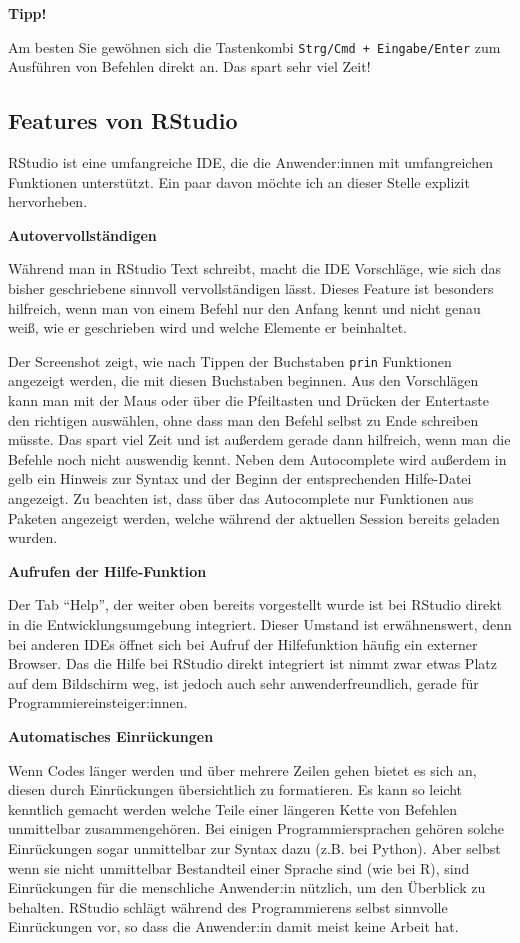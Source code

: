 \documentclass[
]{book}
\begin{document}
\textbf{Tipp!}

Am besten Sie gewöhnen sich die Tastenkombi \texttt{Strg/Cmd\ +\ Eingabe/Enter} zum Ausführen von Befehlen direkt an. Das spart sehr viel Zeit!

\hypertarget{features-von-rstudio}{%
\subsection{Features von RStudio}\label{features-von-rstudio}}

RStudio ist eine umfangreiche IDE, die die Anwender:innen mit umfangreichen Funktionen unterstützt. Ein paar davon möchte ich an dieser Stelle explizit hervorheben.

\textbf{Autovervollständigen}

Während man in RStudio Text schreibt, macht die IDE Vorschläge, wie sich das bisher geschriebene sinnvoll vervollständigen lässt. Dieses Feature ist besonders hilfreich, wenn man von einem Befehl nur den Anfang kennt und nicht genau weiß, wie er geschrieben wird und welche Elemente er beinhaltet.

Der Screenshot zeigt, wie nach Tippen der Buchstaben \texttt{prin} Funktionen angezeigt werden, die mit diesen Buchstaben beginnen. Aus den Vorschlägen kann man mit der Maus oder über die Pfeiltasten und Drücken der Entertaste den richtigen auswählen, ohne dass man den Befehl selbst zu Ende schreiben müsste. Das spart viel Zeit und ist außerdem gerade dann hilfreich, wenn man die Befehle noch nicht auswendig kennt. Neben dem Autocomplete wird außerdem in gelb ein Hinweis zur Syntax und der Beginn der entsprechenden Hilfe-Datei angezeigt. Zu beachten ist, dass über das Autocomplete nur Funktionen aus Paketen angezeigt werden, welche während der aktuellen Session bereits geladen wurden.

\textbf{Aufrufen der Hilfe-Funktion}

Der Tab ``Help'', der weiter oben bereits vorgestellt wurde ist bei RStudio direkt in die Entwicklungsumgebung integriert.
Dieser Umstand ist erwähnenswert, denn bei anderen IDEs öffnet sich bei Aufruf der Hilfefunktion häufig ein externer Browser.
Das die Hilfe bei RStudio direkt integriert ist nimmt zwar etwas Platz auf dem Bildschirm weg, ist jedoch auch sehr anwenderfreundlich, gerade für Programmiereinsteiger:innen.

\textbf{Automatisches Einrückungen}

Wenn Codes länger werden und über mehrere Zeilen gehen bietet es sich an, diesen durch Einrückungen übersichtlich zu formatieren. Es kann so leicht kenntlich gemacht werden welche Teile einer längeren Kette von Befehlen unmittelbar zusammengehören.
Bei einigen Programmiersprachen gehören solche Einrückungen sogar unmittelbar zur Syntax dazu (z.B. bei Python). Aber selbst wenn sie nicht unmittelbar Bestandteil einer Sprache sind (wie bei R), sind Einrückungen für die menschliche Anwender:in nützlich, um den Überblick zu behalten.
RStudio schlägt während des Programmierens selbst sinnvolle Einrückungen vor, so dass die Anwender:in damit meist keine Arbeit hat.
\end{document}
